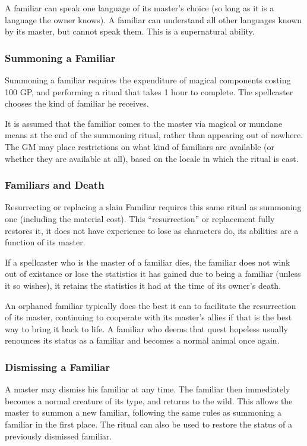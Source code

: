 A familiar can speak one language of its master's choice (so long as it is a language the owner knows). 
A familiar can understand all other languages known by its master, but cannot speak them. This is a supernatural ability. 
\subsubsection{Summoning a Familiar}
Summoning a familiar requires the expenditure of magical components costing 100 GP, 
and performing a ritual that takes 1 hour to complete.
The spellcaster chooses the kind of familiar he receives.

It is assumed that the familiar comes to the master via magical or mundane means at the end of the summoning ritual, 
rather than appearing out of nowhere.
The GM may place restrictions on what kind of familiars are available (or whether they are available at all), 
based on the locale in which the ritual is cast.
\subsubsection{Familiars and Death}
Resurrecting or replacing a slain Familiar requires this same ritual as summoning one (including the material cost).
This ``resurrection'' or replacement fully restores it, it does not have experience to lose as characters do, its abilities are a function of its master.

If a spellcaster who is the master of a familiar dies, the familiar does not wink out of existance or lose the statistics it has gained due to being a familiar (unless it so wishes), 
it retains the statistics it had at the time of its owner's death.

An orphaned familiar typically does the best it can to facilitate the resurrection of its master, continuing to cooperate with its master's allies if that is the best way to bring it back to life.
A familiar who deems that quest hopeless usually renounces its status as a familiar and becomes a normal animal once again.
\subsubsection{Dismissing a Familiar}
A master may dismiss his familiar at any time. The familiar then immediately becomes a normal creature of its type, and returns to the wild.
This allows the master to summon a new familiar, following the same rules as summoning a familiar in the first place.
The ritual can also be used to restore the status of a previously dismissed familiar.

